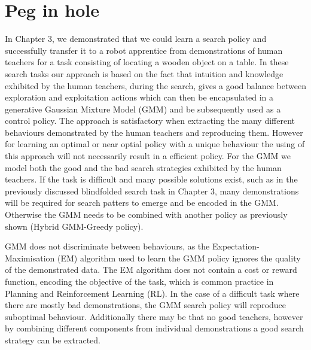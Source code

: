 \chapter{Peg in hole}

In Chapter 3, we demonstrated that we could learn a search policy and successfully transfer it to a robot apprentice
from demonstrations of human teachers for a task consisting of locating a wooden object on a table. 
In these search tasks our approach is based on the fact that intuition and knowledge exhibited by the human teachers, 
during the search, gives a good balance between exploration and exploitation actions which can then be encapsulated in 
a generative Gaussian Mixture Model (GMM) and be subsequently used as a control policy. 
The approach is satisfactory when extracting the many different behaviours demonstrated by the human teachers and reproducing 
them. However for learning an optimal or near optial policy with a unique behaviour the using  
of this approach will not necessarily result in a efficient policy. For the GMM we model
both the good and the bad search strategies exhibited by the human teachers. If the task is difficult and many possible solutions exist, such 
as in the previously discussed blindfolded search task in Chapter 3, many demonstrations will be required for search patters to
emerge and be encoded in the GMM. Otherwise the GMM needs to be combined with another policy as previously shown (Hybrid GMM-Greedy 
policy). 


GMM does not discriminate between behaviours, as the Expectation-Maximisation (EM) algorithm used to 
learn the GMM policy ignores the quality of the demonstrated data. The EM algorithm does not contain a cost or 
reward function, encoding the objective of the task, which is common practice in Planning and Reinforcement Learning (RL). 
In the case of a difficult task where there are mostly bad demonstrations, the GMM search policy will reproduce suboptimal behaviour.
Additionally there may be that no good teachers, however by combining different components from 
individual demonstrations a good search strategy can be extracted.


